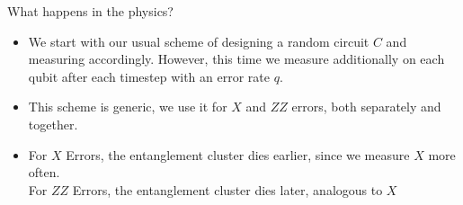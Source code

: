 \par{What happens in the physics?}
\begin{itemize}
  \item We start with our usual scheme of designing a random circuit $C$ and
    measuring accordingly. However, this time we measure additionally on
    each qubit after each timestep with an error rate $q$.
  \item This scheme is generic, we use it for $X$ and $ZZ$ errors, both
    separately and together. 
  \item For $X$ Errors, the entanglement cluster dies earlier, since we measure
    $X$ more often.\\
    For $ZZ$ Errors, the entanglement cluster dies later, analogous to $X$\\
\end{itemize}

